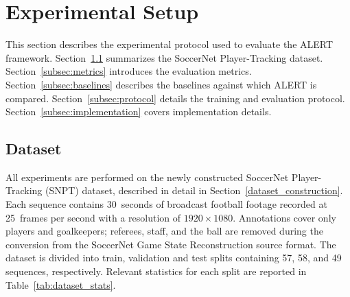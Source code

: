 %

\section{Experimental Setup}\label{sec:experimental_setup}

This section describes the experimental protocol used to evaluate the ALERT framework.
Section~\ref{subsec:dataset} summarizes the SoccerNet Player-Tracking dataset.
Section~\ref{subsec:metrics} introduces the evaluation metrics.
Section~\ref{subsec:baselines} describes the baselines against which ALERT is compared.
Section~\ref{subsec:protocol} details the training and evaluation protocol.
Section~\ref{subsec:implementation} covers implementation details.

\subsection{Dataset}\label{subsec:dataset}

All experiments are performed on the newly constructed SoccerNet Player-Tracking (SNPT) dataset, described in detail in Section~\ref{dataset_construction}. Each sequence contains 30~seconds of broadcast football footage recorded at 25~frames per second with a resolution of $1920\times1080$. Annotations cover only players and goalkeepers; referees, staff, and the ball are removed during the conversion from the SoccerNet Game State Reconstruction \cite{soccernetgsr} source format. The dataset is divided into train, validation and test splits containing 57, 58, and 49 sequences, respectively. Relevant statistics for each split are reported in Table~\ref{tab:dataset_stats}.


